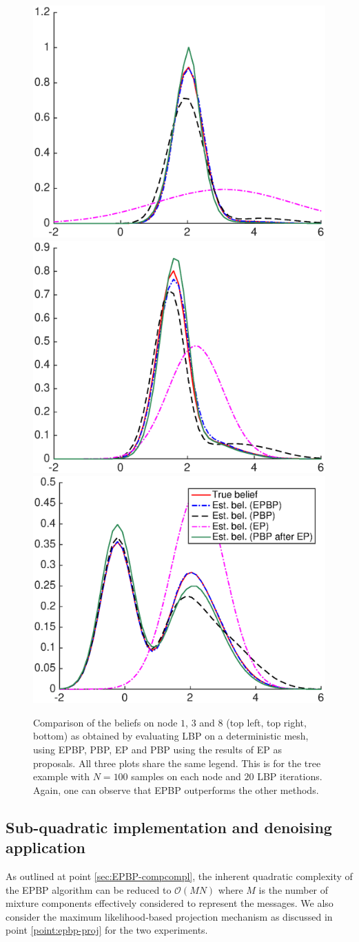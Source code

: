 \begin{figure}[!h]
\center
	\includegraphics[width=.48\textwidth]{figures/epbp/tree_node1}
	\includegraphics[width=.48\textwidth]{figures/epbp/tree_node3}
	\includegraphics[width=.48\textwidth]{figures/epbp/tree_node8}

	\caption{\label{compTree}Comparison of the beliefs on node $1$, $3$ and $8$ (top left, top right, bottom) as obtained by evaluating LBP on a deterministic mesh, using EPBP, PBP, EP and PBP using the results of EP as proposals. All three plots share the same legend. This is for the tree example with $N=100$ samples on each node and $20$ LBP iterations. Again, one can observe that EPBP outperforms the other methods. }
\end{figure}

\subsection{Sub-quadratic implementation and denoising application}
As outlined at point \ref{sec:EPBP-compcompl}, the inherent quadratic complexity of the EPBP algorithm can be reduced to $\mathcal O(MN)$ where $M$ is the number of mixture components effectively considered to represent the messages. We also consider the maximum likelihood-based projection mechanism as discussed in point \ref{point:epbp-proj} for the two experiments.

